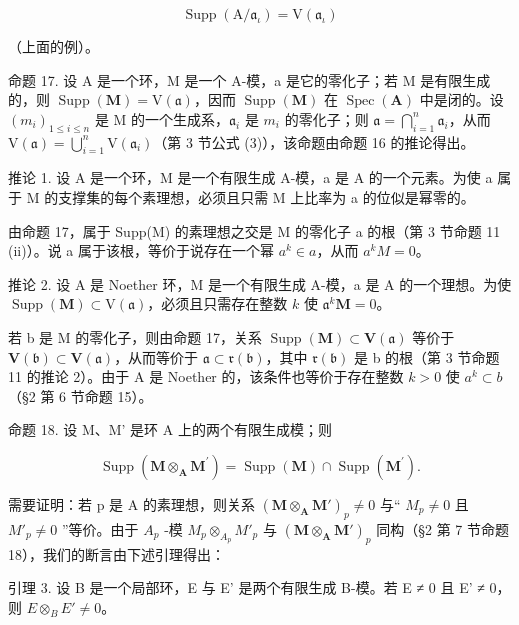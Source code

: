 \[
\operatorname{Supp} (\mathrm{A} / \mathfrak {a} _ {\iota}) = \mathrm{V} (\mathfrak {a} _ {\iota})
\]

（上面的例）。

命题 17. 设 A 是一个环，M 是一个 A-模，a 是它的零化子；若 M 是有限生成的，则 \(\operatorname{Supp}(\mathbf{M}) = \mathrm{V}(\mathfrak{a})\)，因而 \(\operatorname{Supp}(\mathbf{M})\) 在 \(\operatorname{Spec}(\mathbf{A})\) 中是闭的。设 \((m_i)_{1 \leqslant i \leqslant n}\) 是 M 的一个生成系，\(\mathfrak{a}_i\) 是 \(m_i\) 的零化子；则 \(\mathfrak{a} = \bigcap_{i=1}^{n} \mathfrak{a}_i\)，从而 \(\mathrm{V}(\mathfrak{a}) = \bigcup_{i=1}^{n} \mathrm{V}(\mathfrak{a}_i)\)（第 3 节公式 (3)），该命题由命题 16 的推论得出。

推论 1. 设 A 是一个环，M 是一个有限生成 A-模，a 是 A 的一个元素。为使 a 属于 M 的支撑集的每个素理想，必须且只需 M 上比率为 a 的位似是幂零的。

由命题 17，属于 Supp(M) 的素理想之交是 M 的零化子 a 的根（第 3 节命题 11 (ii)）。说 a 属于该根，等价于说存在一个幂 \(a^{k} \in a\)，从而 \(a^{k}M = 0\)。

推论 2. 设 A 是 Noether 环，M 是一个有限生成 A-模，a 是 A 的一个理想。为使 \(\operatorname{Supp}(\mathbf{M}) \subset \mathrm{V}(\mathfrak{a})\)，必须且只需存在整数 \(k\) 使 \(\mathfrak{a}^k\mathbf{M} = 0\)。

若 b 是 M 的零化子，则由命题 17，关系 \(\operatorname{Supp}(\mathbf{M}) \subset \mathbf{V}(\mathfrak{a})\) 等价于 \(\mathbf{V}(\mathfrak{b}) \subset \mathbf{V}(\mathfrak{a})\)，从而等价于 \(\mathfrak{a} \subset \mathfrak{r}(\mathfrak{b})\)，其中 \(\mathfrak{r}(\mathfrak{b})\) 是 b 的根（第 3 节命题 11 的推论 2）。由于 A 是 Noether 的，该条件也等价于存在整数 \(k > 0\) 使 \(a^{k} \subset b\)（§2 第 6 节命题 15）。

命题 18. 设 M、M' 是环 A 上的两个有限生成模；则

\[
\operatorname{Supp} (\mathbf {M} \otimes_ {\mathbf {A}} \mathbf {M} ^ {\prime}) = \operatorname{Supp} (\mathbf {M}) \cap \operatorname{Supp} (\mathbf {M} ^ {\prime}).\tag{10}
\]

需要证明：若 p 是 A 的素理想，则关系 \((\mathbf{M} \otimes_{\mathbf{A}} \mathbf{M}')_{p} \neq 0\) 与`` \(M_{p} \neq 0\) 且 \(M'_{p} \neq 0\) ''等价。由于 \(A_{p}\) -模 \(M_{p} \otimes_{A_{p}} M'_{p}\) 与 \((\mathbf{M} \otimes_{\mathbf{A}} \mathbf{M}')_{p}\) 同构（§2 第 7 节命题 18），我们的断言由下述引理得出：

引理 3. 设 B 是一个局部环，E 与 E' 是两个有限生成 B-模。若 E ≠ 0 且 E' ≠ 0，则 \(E \otimes_{B} E' \neq 0\)。

